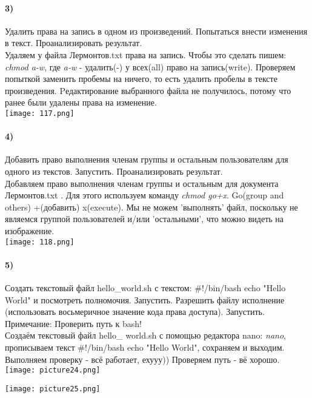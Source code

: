 		\paragraph{3)}
		Удалить права на запись в одном из произведений. Попытаться внести изменения в текст. Проанализировать результат. 
		\\
		Удаляем у файла Лермонтов.txt права на запись. Чтобы это сделать пишем: 		\textit{chmod a-w}, где \textit{a-w} - удалить(-) у всех(all) право на 				запись(write). Проверяем попыткой заменить пробемы на ничего, то есть удалить 		пробелы в тексте произведения. Pедактирование выбранного файла не получилось, потому что ранее были удалены права на изменение. \\
	\texttt{[image: 117.png]}
	\\
	
		\paragraph{4)}
		Добавить право выполнения членам группы и остальным пользователям для одного из текстов. Запустить. Проанализировать результат. 
		\\
		Добавляем право выполнения членам группы и остальным  для документа 			Лермонтов.txt . Для этого используем команду \textit{chmod go+x}. Go(group and 		others) +(добавить) x(execute). Мы не можем 'выполнять' файл, поскольку не являемся группой пользователей и/или 'остальными', что можно видеть на изображение. \\
	\texttt{[image: 118.png]}
	\\
		\paragraph{5)}
		Создать текстовый файл hello_world.sh с текстом: #!/bin/bash echo "Hello World"
и посмотреть полномочия. Запустить. Разрешить файлу исполнение (использовать восьмеричное значение кода права доступа). Запустить. Примечание: Проверить путь к bash! 
	\\
		Создаём текстовый файл hello\_ world.sh с помощью редактора nano: 				\textit{nano}, прописываем текст \#!/bin/bash echo "Hello World", сохраняем и 		выходим. Выполняем проверку - всё работает, ехууу)) Проверяем путь - вё хорошо.		\\
	\texttt{[image: picture24.png]}
	\begin{center}
		\texttt{[image: picture25.png]}
	\end{center}
	

